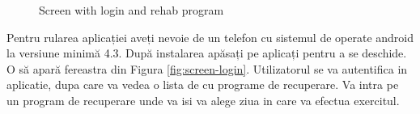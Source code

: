 \begin{figure}[!htb]
  \centering
  \hfill
    
    \caption{Screen with login and rehab program}
\end{figure}

Pentru rularea aplicației aveți nevoie de un telefon cu
sistemul de operate android la versiune minimă 4.3.
După instalarea apăsați pe aplicați pentru a se deschide.
O să apară fereastra din Figura \ref{fig:screen-login}.
Utilizatorul se va autentifica in aplicatie, dupa care va vedea o lista de cu programe de recuperare.
Va intra pe un program de recuperare unde va isi va alege ziua in care va efectua exercitul.


